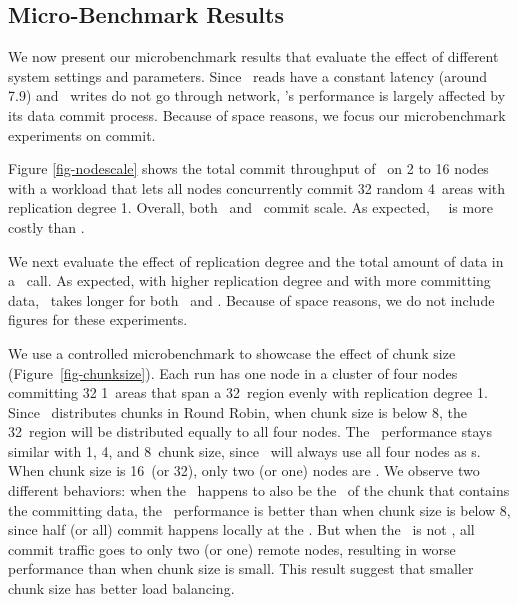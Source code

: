 
\subsection{Micro-Benchmark Results}
\label{sec:results}

We now present our microbenchmark results that evaluate the effect of different system settings and parameters.
Since \hotpot\ reads have a constant latency (around 7.9\us) and \hotpot\ writes do not go through network,
\hotpot's performance is largely affected by its data commit process.
Because of space reasons, we focus our microbenchmark experiments on commit.

Figure \ref{fig-nodescale} shows the total commit throughput of \hotpot\ on 2 to 16 nodes with a workload 
that lets all nodes concurrently commit 32 random 4\KB\ areas with replication degree 1. 
Overall, both \mrmw\ and \mrsw\ commit scale.
As expected, \mrmw\ \commitxact\ is more costly than \mrsw. 

We next evaluate the effect of replication degree and the total amount of data in a \commitxact\ call.
As expected, with higher replication degree and with more committing data, \commitxact\ takes longer for both \mrmw\ and \mrsw.
Because of space reasons, we do not include figures for these experiments.

We use a controlled microbenchmark to showcase the effect of chunk size (Figure~\ref{fig-chunksize}).
Each run has one node in a cluster of four nodes committing 32 1\KB\ areas that span a 32\MB\ region evenly with replication degree 1.
Since \hotpot\ distributes chunks in Round Robin, 
when chunk size is below 8\MB, the 32\MB\ region will be distributed equally to all four nodes.
The \commitxact\ performance stays similar with 1, 4, and 8\MB\ chunk size,
since \commitxact\ will always use all four nodes as \on{}s.
When chunk size is 16\MB\ (or 32\MB), only two (or one) nodes are \on.
We observe two different behaviors:
when the \xn\ happens to also be the \on\ of the chunk that contains the committing data,
the \commitxact\ performance is better than when chunk size is below 8\MB, since half (or all) commit happens locally at the \xn.
But when the \xn\ is not \on, all commit traffic goes to only two (or one) remote nodes,
resulting in worse performance than when chunk size is small.
This result suggest that smaller chunk size has better load balancing.

